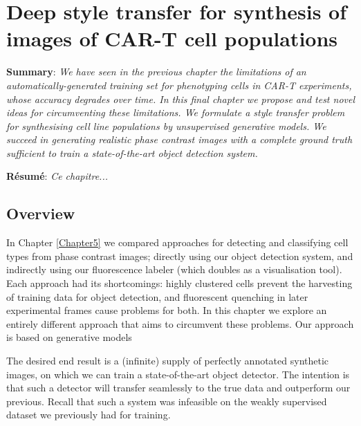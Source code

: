 
\chapter{Deep style transfer for synthesis of images of CAR-T cell populations} %

\label{Chapter6} %

\textbf{Summary}: \emph{We have seen in the previous chapter the limitations of an automatically-generated training set for phenotyping cells in CAR-T experiments, whose accuracy degrades over time. In this final chapter we propose and test novel ideas for circumventing these limitations. We formulate a style transfer problem for synthesising cell line populations by unsupervised generative models. We succeed in generating realistic phase contrast images with a complete ground truth sufficient to train a state-of-the-art object detection system.}

\textbf{R\'esum\'e}: \emph{Ce chapitre...}

\section{Overview}

In Chapter \ref{Chapter5} we compared approaches for detecting and classifying cell types from phase contrast images; directly using our object detection system, and indirectly using our fluorescence labeler (which doubles as a visualisation tool). Each approach had its shortcomings: highly clustered cells prevent the harvesting of training data for object detection, and fluorescent quenching in later experimental frames cause problems for both. In this chapter we explore an entirely different approach that aims to circumvent these problems. Our approach is based on generative models

The desired end result is a (infinite) supply of perfectly annotated synthetic images, on which we can train a state-of-the-art object detector. The intention is that such a detector will transfer seamlessly to the true data and outperform our previous. Recall that such a system was infeasible on the weakly supervised dataset we previously had for training.

